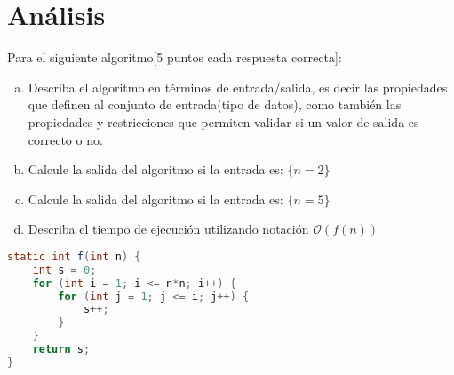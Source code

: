 \documentclass{exam}
\begin{document}
\newpage 
\section{Análisis}
Para el siguiente algoritmo[5 puntos cada respuesta correcta]:
\begin{enumerate}[a.]
    \item Describa el algoritmo en términos de entrada/salida, es decir las propiedades que definen al conjunto de entrada(tipo de datos), como también las propiedades y restricciones que permiten validar si un valor de salida es correcto o no.
    \item Calcule la salida del algoritmo si la entrada es: $\{ n = 2\}$
    \item Calcule la salida del algoritmo si la entrada es: $\{ n = 5\}$
    \item Describa el tiempo de ejecución utilizando notación $\mathcal{O}(f(n))$
\end{enumerate}
\begin{lstlisting}[language=java]
static int f(int n) {
    int s = 0;
    for (int i = 1; i <= n*n; i++) {
        for (int j = 1; j <= i; j++) {
            s++;
        }
    }
    return s;
}
\end{lstlisting}
\end{document}

